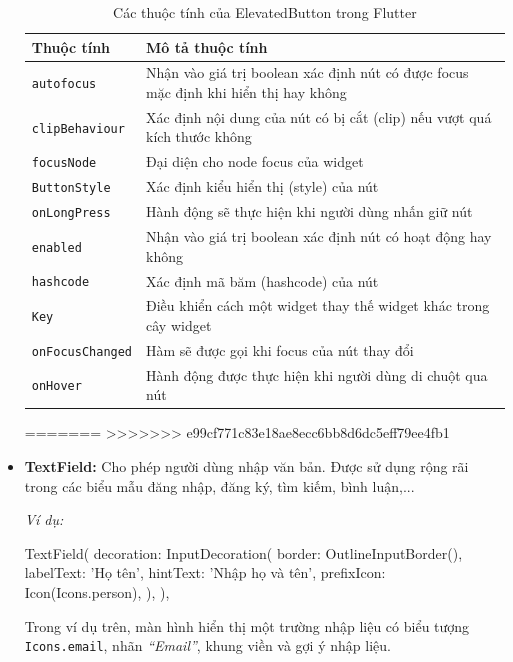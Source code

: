 \documentclass[../DoAn.tex]{subfiles}
\numberwithin{figure}{chapter}
\begin{document}
\begin{itemize}
\begin{table}[H]
\centering
\begin{tabular}{|>{\centering\arraybackslash}p{4cm}|>{\centering\arraybackslash}p{9cm}|}
\hline
\textbf{Thuộc tính} & \textbf{Mô tả thuộc tính} \\ \hline
\texttt{autofocus} & Nhận vào giá trị boolean xác định nút có được focus mặc định khi hiển thị hay không \\ \hline
\texttt{clipBehaviour} & Xác định nội dung của nút có bị cắt (clip) nếu vượt quá kích thước không \\ \hline
\texttt{focusNode} & Đại diện cho node focus của widget \\ \hline
\texttt{ButtonStyle} & Xác định kiểu hiển thị (style) của nút \\ \hline
\texttt{onLongPress} & Hành động sẽ thực hiện khi người dùng nhấn giữ nút \\ \hline
\texttt{enabled} & Nhận vào giá trị boolean xác định nút có hoạt động hay không \\ \hline
\texttt{hashcode} & Xác định mã băm (hashcode) của nút \\ \hline
\texttt{Key} & Điều khiển cách một widget thay thế widget khác trong cây widget \\ \hline
\texttt{onFocusChanged} & Hàm sẽ được gọi khi focus của nút thay đổi \\ \hline
\texttt{onHover} & Hành động được thực hiện khi người dùng di chuột qua nút \\ \hline
\end{tabular}
\caption{Các thuộc tính của ElevatedButton trong Flutter}
\label{tab:elevated_button_properties}
\end{table}

=======
>>>>>>> e99cf771c83e18ae8ecc6bb8d6dc5eff79ee4fb1
\item \textbf{TextField:} Cho phép người dùng nhập văn bản. Được sử dụng rộng rãi trong các biểu mẫu đăng nhập, đăng ký, tìm kiếm, bình luận,...

\textit{Ví dụ:}
\begin{myverbatim}
TextField(
  decoration: InputDecoration(
    border: OutlineInputBorder(),
    labelText: 'Họ tên',
    hintText: 'Nhập họ và tên',
    prefixIcon: Icon(Icons.person),
  ),
),
\end{myverbatim}

Trong ví dụ trên, màn hình hiển thị một trường nhập liệu có biểu tượng \texttt{Icons.email}, nhãn \textit{“Email”}, khung viền và gợi ý nhập liệu.


\end{itemize}
\end{document}
